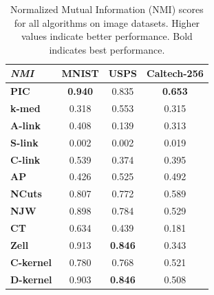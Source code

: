 \begin{table}[h]
\centering
\begin{tabular}{|l|c|c|c|}
\hline
\textit{NMI} & \textbf{MNIST} & \textbf{USPS} & \textbf{Caltech-256} \\
\hline
\textbf{PIC}       & \textbf{0.940} & 0.835 & \textbf{0.653} \\ \hline
\textbf{k-med}     & 0.318 & 0.553 & 0.315 \\ \hline
\textbf{A-link}    & 0.408 & 0.139 & 0.313 \\ \hline
\textbf{S-link}    & 0.002 & 0.002 & 0.019 \\ \hline
\textbf{C-link}    & 0.539 & 0.374 & 0.395 \\ \hline
\textbf{AP}        & 0.426 & 0.525 & 0.492 \\ \hline
\textbf{NCuts}     & 0.807 & 0.772 & 0.589 \\ \hline
\textbf{NJW}       & 0.898 & 0.784 & 0.529 \\ \hline
\textbf{CT}        & 0.634 & 0.439 & 0.181 \\ \hline
\textbf{Zell}      & 0.913 & \textbf{0.846} & 0.343 \\ \hline
\textbf{C-kernel}  & 0.780 & 0.768 & 0.521 \\ \hline
\textbf{D-kernel}  & 0.903 & \textbf{0.846} & 0.508 \\
\hline
\end{tabular}
\caption{Normalized Mutual Information (NMI) scores for all algorithms on image datasets. Higher values indicate better performance. Bold indicates best performance.}
\label{table:nmi}
\end{table}

